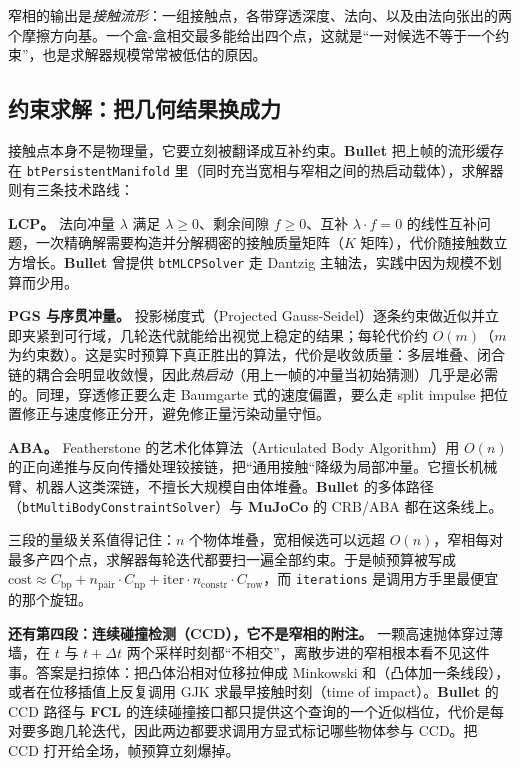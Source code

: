 \documentclass[12pt,a4paper,fontset=fandol]{ctexbook}
\newcommand{\Tp}[1]{\texttt{#1}}
\newcommand{\Bk}{\allowbreak}
\newcommand{\Lib}[1]{\textbf{#1}}
\begin{document}
窄相的输出是\emph{接触流形}：一组接触点，各带穿透深度、法向、以及由法向张出的两个摩擦方向基。一个盒-盒相交最多能给出四个点，这就是``一对候选不等于一个约束''，也是求解器规模常常被低估的原因。

\subsection{约束求解：把几何结果换成力}

接触点本身不是物理量，它要立刻被翻译成互补约束。\Lib{Bullet} 把上帧的流形缓存在 \Tp{bt\Bk Persistent\Bk Manifold} 里（同时充当宽相与窄相之间的热启动载体），求解器则有三条技术路线：

\textbf{LCP。} 法向冲量 $\lambda$ 满足 $\lambda \ge 0$、剩余间隙 $f \ge 0$、互补 $\lambda \cdot f = 0$ 的线性互补问题，一次精确解需要构造并分解稠密的接触质量矩阵（$K$ 矩阵），代价随接触数立方增长。\Lib{Bullet} 曾提供 \Tp{bt\Bk MLCPSolver} 走 Dantzig 主轴法，实践中因为规模不划算而少用。

\textbf{PGS 与序贯冲量。} 投影梯度式（Projected Gauss-Seidel）逐条约束做近似并立即夹紧到可行域，几轮迭代就能给出视觉上稳定的结果；每轮代价约 $O(m)$（$m$ 为约束数）。这是实时预算下真正胜出的算法，代价是收敛质量：多层堆叠、闭合链的耦合会明显收敛慢，因此\emph{热启动}（用上一帧的冲量当初始猜测）几乎是必需的。同理，穿透修正要么走 Baumgarte 式的速度偏置，要么走 split impulse 把位置修正与速度修正分开，避免修正量污染动量守恒。

\textbf{ABA。} Featherstone 的艺术化体算法（Articulated Body Algorithm）用 $O(n)$ 的正向递推与反向传播处理铰接链，把``通用接触``降级为局部冲量。它擅长机械臂、机器人这类深链，不擅长大规模自由体堆叠。\Lib{Bullet} 的多体路径（\Tp{bt\Bk Multi\Bk Body\Bk Constraint\Bk Solver}）与 \Lib{MuJoCo} 的 CRB/ABA 都在这条线上。

三段的量级关系值得记住：$n$ 个物体堆叠，宽相候选可以远超 $O(n)$，窄相每对最多产四个点，求解器每轮迭代都要扫一遍全部约束。于是帧预算被写成 $\text{cost} \approx C_{\text{bp}} + n_{\text{pair}} \cdot C_{\text{np}} + \text{iter} \cdot n_{\text{constr}} \cdot C_{\text{row}}$，而 \Tp{iterations} 是调用方手里最便宜的那个旋钮。

\textbf{还有第四段：连续碰撞检测（CCD），它不是窄相的附注。} 一颗高速抛体穿过薄墙，在 $t$ 与 $t+\Delta t$ 两个采样时刻都``不相交''，离散步进的窄相根本看不见这件事。答案是扫掠体：把凸体沿相对位移拉伸成 Minkowski 和（凸体加一条线段），或者在位移插值上反复调用 GJK 求最早接触时刻（time of impact）。\Lib{Bullet} 的 CCD 路径与 \Lib{FCL} 的连续碰撞接口都只提供这个查询的一个近似档位，代价是每对要多跑几轮迭代，因此两边都要求调用方显式标记哪些物体参与 CCD。把 CCD 打开给全场，帧预算立刻爆掉。
\end{document}
